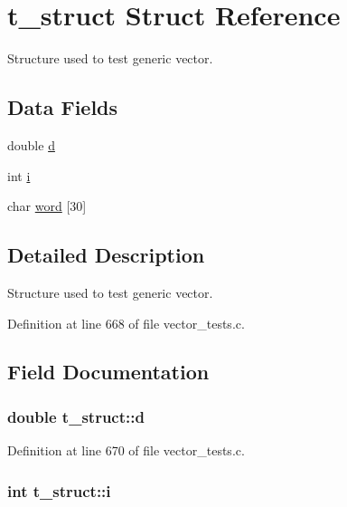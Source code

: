 \hypertarget{structt__struct}{\section{t\-\_\-struct Struct Reference}
\label{structt__struct}
}


Structure used to test generic vector.  


\subsection*{Data Fields}
\begin{DoxyCompactItemize}
\item 
double \hyperlink{structt__struct_a2029e2f2da88d23bcc9fa6ba45f51bf4}{d}
\item 
int \hyperlink{structt__struct_a488184c86cae0be164cfb634882b8f7a}{i}
\item 
char \hyperlink{structt__struct_af32b8acd2bade0a8ceb0aa9400a34daa}{word} \mbox{[}30\mbox{]}
\end{DoxyCompactItemize}


\subsection{Detailed Description}
Structure used to test generic vector. 



Definition at line 668 of file vector\-\_\-tests.\-c.



\subsection{Field Documentation}
\hypertarget{structt__struct_a2029e2f2da88d23bcc9fa6ba45f51bf4}{
\subsubsection[{d}]{\setlength{\rightskip}{0pt plus 5cm}double t\-\_\-struct\-::d}}\label{structt__struct_a2029e2f2da88d23bcc9fa6ba45f51bf4}


Definition at line 670 of file vector\-\_\-tests.\-c.

\hypertarget{structt__struct_a488184c86cae0be164cfb634882b8f7a}{
\subsubsection[{i}]{\setlength{\rightskip}{0pt plus 5cm}int t\-\_\-struct\-::i}}\label{structt__struct_a488184c86cae0be164cfb634882b8f7a}


